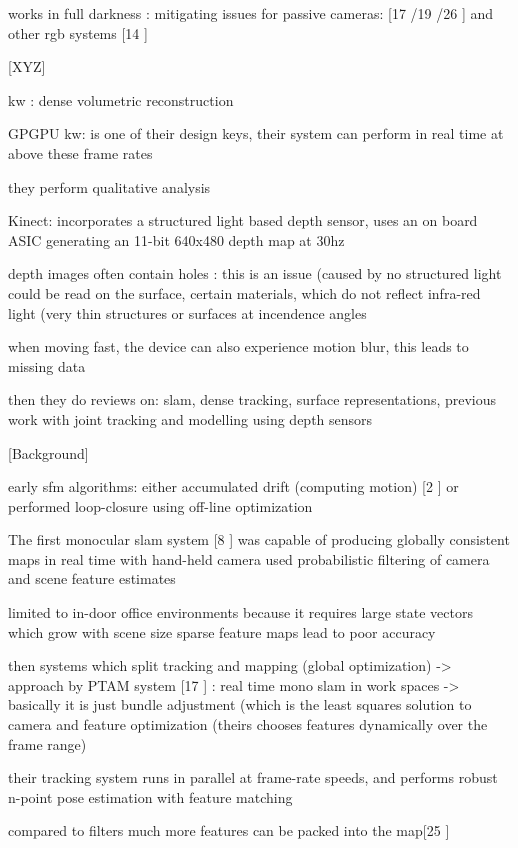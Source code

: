 works in full darkness : mitigating issues for passive cameras: [17 \cite{Klein07Parallel} /19 \cite{Newcombe10Live} /26 \cite{Stuhmer10Real}] and other rgb systems [14 \cite{Henry10Rgb}]

[XYZ]

kw : dense volumetric reconstruction

GPGPU kw: is one of their design keys, their system can perform in real time at above these frame rates

they perform qualitative analysis

Kinect: incorporates a structured light based depth sensor, uses an on board ASIC generating an 11-bit 640x480 depth map at 30hz

depth images often contain holes : this is an issue (caused by no structured light could be read on the surface, certain materials, which do not reflect infra-red light (very thin structures or surfaces at incendence angles

when moving fast, the device can also experience motion blur, this leads to missing data

then they do  reviews on:
	slam, dense tracking, surface representations, previous work with joint tracking and modelling using depth sensors

[Background]

early sfm algorithms: either accumulated drift (computing motion) [2 \cite{Beardsley97Sequential} ] or performed loop-closure using off-line optimization 

The first monocular slam system [8 \cite{Davison03Real} ] was capable of producing globally consistent maps in real time with hand-held camera used probabilistic filtering of camera and scene feature estimates

limited to in-door office environments because it requires large state vectors which grow with scene size
sparse feature maps lead to poor accuracy

then systems which split tracking and mapping (global optimization) -> approach by PTAM system [17 \cite{Klein07Parallel}]
: real time mono slam in work spaces -> basically it is just bundle adjustment (which is the least squares solution to camera and feature optimization (theirs chooses features dynamically over the frame range)

their tracking system runs in parallel at frame-rate speeds, and performs robust n-point pose estimation with feature matching

compared to filters much more features can be packed into the map[25 \cite{Strasdat10Real} ]

